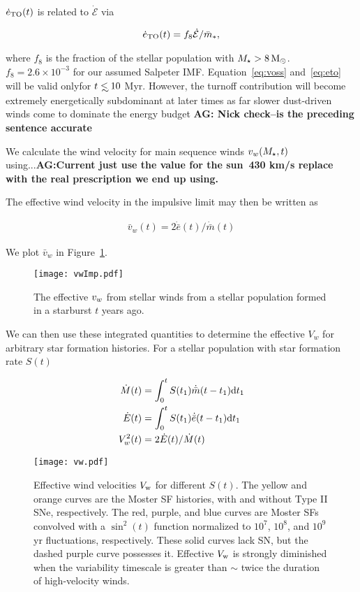 $\dot{e}_{\rm TO}(t)$ is related to $\dot{\mathcal{E}}$  via 

\begin{align}
\dot{e}_{\rm TO}(t)=f_{8} \dot{\mathcal{E}} / \bar{m}_*,
\label{eq:eto}
\end{align}

where $f_{8}$ is the fraction of the stellar population with
$M_{\star}>8 \,{\rm M_\odot}$. $f_8=2.6 \times 10^{-3}$ for our assumed Salpeter
IMF.  Equation~\eqref{eq:voss} and~\eqref{eq:eto} will be valid onlyfor $t
\lsim 10$ Myr. However, the turnoff contribution will become extremely
energetically subdominant at later times as far slower dust-driven
winds come to dominate the energy budget {\bf AG: Nick check--is the
  preceding sentence accurate}

We calculate the wind velocity for main sequence winds $v_w (M_{\star},
t)$ using...{\bf AG:Current just use the value for the sun~430 km/s
  replace with the real prescription we end up using.}

The effective wind velocity in the impulsive limit may then be written
as 

\begin{align}
\bar{v}_w(t)=2 \dot{\bar{e}}(t)/\dot{\bar{m}}(t)
\label{eq:vwImp}
\end{align}

We plot $\bar{v}_w$ in Figure~\ref{fig:vwImp}.

\begin{figure}
\texttt{[image: vwImp.pdf]}
\caption{\label{fig:vwImp} The effective $v_w$ from stellar winds from
  a stellar population formed in a starburst $t$ years ago.}
\end{figure}

We can then use these integrated quantities to determine the effective
$V_w$ for arbitrary star formation histories. For a stellar population
with star formation rate $S(t)$ 

\begin{align} 
  \dot{M}(t) &= \int_0^t S(t_1) \dot{\bar{m}}(t-t_1){\rm
      d}t_1\\
  \dot{E}(t) &= \int_0^t S(t_1) \dot{\bar{e}}(t-t_1){\rm
      d}t_1\\
  V_w^2(t) &=2 \dot{E}(t)/\dot{M}(t)
\end{align}

\begin{figure}
\texttt{[image: vw.pdf]}
\caption{\label{NickPlot2} Effective wind velocities $V_{\rm w}$ for
different $S(t)$.  The yellow and orange curves are the Moster SF
histories, with and without Type II SNe, respectively.  The red,
purple, and blue curves are Moster SFs convolved with a $\sin^2(t)$
function normalized to $10^7$, $10^8$, and $10^9$ yr fluctuations,
respectively.  These solid curves lack SN, but the dashed purple curve
possesses it.  Effective $V_{\rm w}$ is strongly diminished when the
variability timescale is greater than $\sim$ twice the duration of
high-velocity winds.}
\end{figure}

